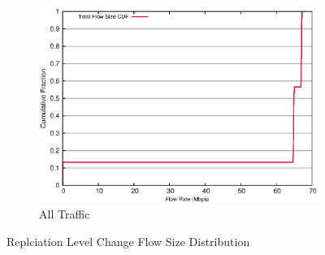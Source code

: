 \begin{figure}[!ht]
\begin{subfigure}[b]{.75\linewidth}
	\includegraphics[width=.99\textwidth]{figures/replica_change/flow_size.eps}
	\caption{All Traffic}\label{fig:read_size:all}
   \end{subfigure}%
\caption{Replciation Level Change Flow Size Distribution}
\end{figure}

